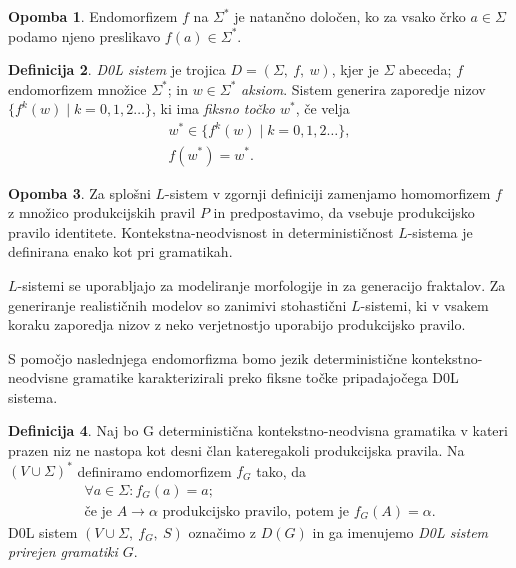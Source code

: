 \documentclass{amsart}
\theoremstyle{definition}
\newtheorem{definicija}{Definicija}[section]
\newtheorem{opomba}[definicija]{Opomba}
\theoremstyle{plain} %
\begin{document}
\begin{opomba}
    
    Endomorfizem $ f $ na $ \Sigma^* $ je natančno določen, ko za vsako črko $ a \in \Sigma $ podamo njeno preslikavo $ f(a) \in \Sigma^* $.

\end{opomba}

\begin{definicija}
    
    \textit{D0L sistem} je trojica $ D = (\Sigma, \ f, \ w) $, kjer je $ \Sigma $ abeceda; $ f $ endomorfizem množice $ \Sigma^* $;
    in $ w \in \Sigma^* $ \textit{aksiom}. Sistem generira zaporedje nizov $ \{ f^k(w) \mid k = 0, 1,2 \ldots \} $, 
    ki ima \textit{fiksno točko $ w^* $}, če velja
    \begin{gather*}
        w^* \in \{ f^k(w) \mid k = 0, 1,2 \ldots \}, \\
        f(w^*)= w^*.
    \end{gather*}


\end{definicija}

\begin{opomba}
    
    Za splošni $ L $-sistem v zgornji definiciji zamenjamo homomorfizem $ f $ z množico produkcijskih pravil $ P $ in predpostavimo,
    da vsebuje produkcijsko pravilo identitete. Kontekstna-neodvisnost in determinističnost $ L $-sistema je definirana enako kot pri gramatikah. 
    
    $ L $-sistemi se uporabljajo za modeliranje morfologije in za generacijo fraktalov. Za generiranje realističnih modelov
    so zanimivi stohastični $ L $-sistemi, ki v vsakem koraku zaporedja nizov z neko verjetnostjo uporabijo produkcijsko pravilo.

\end{opomba}

S pomočjo naslednjega endomorfizma bomo jezik deterministične kontekstno-neodvisne gramatike karakterizirali preko fiksne točke pripadajočega 
D0L sistema.

\begin{definicija}
    
    Naj bo G deterministična kontekstno-neodvisna gramatika v kateri prazen niz ne nastopa kot desni član kateregakoli
    produkcijska pravila. Na $ (V \cup \Sigma)^* $ definiramo endomorfizem $ f_G $ tako, da 
    \begin{gather*}
        \forall a \in \Sigma \colon f_G(a) = a; \\
        \text{če je } A \rightarrow \alpha \text{ produkcijsko pravilo, potem je } f_G(A) = \alpha.
    \end{gather*}
    D0L sistem $ (V \cup \Sigma, \ f_G, \ S) $ označimo z $ D(G) $ in ga imenujemo \textit{D0L sistem prirejen gramatiki $G$}.

\end{definicija}
\end{document}
